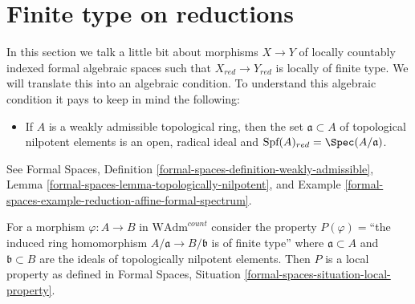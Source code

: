 \section{Finite type on reductions}
\label{section-finite-type-red}

\noindent
In this section we talk a little bit about morphisms $X \to Y$
of locally countably indexed formal algebraic spaces such that
$X_{red} \to Y_{red}$ is locally of finite type. We will translate
this into an algebraic condition. To understand this algebraic
condition it pays to keep in mind the following:
\begin{itemize}
\item If $A$ is a weakly admissible topological ring, then the
set $\mathfrak a \subset A$ of topological nilpotent elements
is an open, radical ideal and
$\text{Spf}(A)_{red} = \Spec(A/\mathfrak a)$.
\end{itemize}
See Formal Spaces, Definition
\ref{formal-spaces-definition-weakly-admissible},
Lemma \ref{formal-spaces-lemma-topologically-nilpotent}, and
Example \ref{formal-spaces-example-reduction-affine-formal-spectrum}.

\begin{lemma}
\label{lemma-finite-type-red}
For a morphism $\varphi : A \to B$ in $\text{WAdm}^{count}$ consider
the property $P(\varphi)=$``the induced ring homomorphism
$A/\mathfrak a \to B/\mathfrak b$ is of finite type''
where $\mathfrak a \subset A$ and $\mathfrak b \subset B$ are the ideals
of topologically nilpotent elements. Then $P$ is a local property
as defined in
Formal Spaces, Situation
\ref{formal-spaces-situation-local-property}.
\end{lemma}

